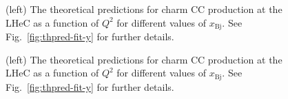 \documentclass[pdftex,twocolumn,epjc3]{svjour3}          %
\newcommand{\xbj}{\ensuremath{x_{\text{Bj}}}\xspace}
\begin{document}
\begin{figure}
    \centering
    \caption{(left) The theoretical predictions for charm CC production at the LHeC as a function of $Q^2$ for different values of $\xbj$. See Fig.~\ref{fig:thpred-fit-y} for further details.}
    \label{fig:thpred-fit-q2}
\end{figure}

\begin{figure}
    \centering
    \caption{(left) The theoretical predictions for charm CC production at the LHeC as a function of $Q^2$ for different values of $\xbj$. See Fig.~\ref{fig:thpred-fit-y} for further details.}
    \label{fig:thpred-fit-x}
\end{figure}
\end{document}
